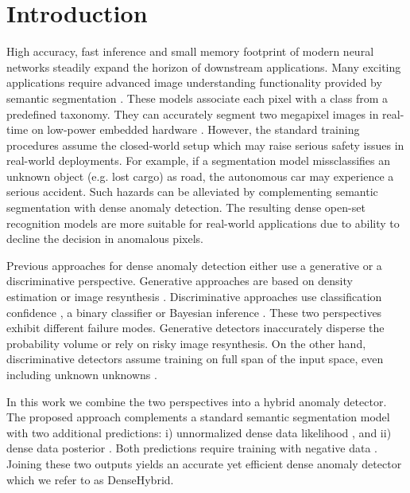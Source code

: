 \documentclass[runningheads]{llncs}
\begin{document}
\section{Introduction}
High accuracy, fast inference and small memory footprint of modern neural networks steadily expand the horizon of downstream applications.
Many exciting applications require advanced image understanding functionality provided by semantic segmentation \cite{farabet13pami}.
These models associate each pixel with a class from a predefined taxonomy.
They can accurately segment two megapixel images in real-time on low-power embedded hardware \cite{chao19iccv,orsic21pr,hong21arxiv}.
However, the standard training procedures assume the closed-world setup which may raise serious safety issues 
in real-world deployments. 
For example, if a segmentation model missclassifies an unknown object (e.g. lost cargo) as road, the autonomous car may experience a serious accident.
Such hazards can be alleviated by complementing semantic segmentation with dense anomaly detection.
The resulting dense open-set recognition models are more suitable for real-world applications due to ability to decline the decision in anomalous pixels.

Previous approaches for dense anomaly detection either use a generative or a discriminative perspective.
Generative approaches are based on density estimation \cite{blum19iccvw} or image resynthesis \cite{lis19iccv,biase21cvpr}.
Discriminative approaches use classification confidence \cite{hendrycks19arxiv}, a binary classifier  \cite{bevandic19gcpr} or Bayesian inference \cite{kendall17nips}.
These two perspectives exhibit different failure modes.
Generative detectors inaccurately disperse 
the probability volume \cite{nalisnick19iclr,serra20iclr,lucas19nips,zhang21icml} or rely on risky image resynthesis.
On the other hand, discriminative detectors assume training on full span of the input space, even including unknown unknowns \cite{hendrycks19iclr}.


In this work we combine the two perspectives into a hybrid anomaly detector.
The proposed approach complements a standard semantic segmentation model with two additional predictions:
i) unnormalized dense data likelihood  \cite{blum19iccvw}, and ii)
dense data posterior  \cite{bevandic19gcpr}.
Both predictions require training with negative data \cite{hendrycks19iclr,bevandic19gcpr,biase21cvpr,chan21iccv}.
Joining these two outputs yields an accurate yet efficient dense anomaly detector which we refer to as DenseHybrid.
\end{document}
